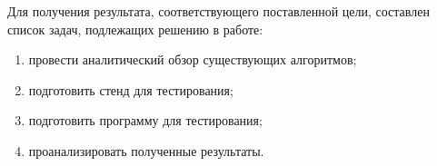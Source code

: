 Для получения результата, соответствующего поставленной цели, составлен список задач, подлежащих решению в работе:
\begin{enumerate}
    \item провести аналитический обзор существующих алгоритмов;
    \item подготовить стенд для тестирования;
    \item подготовить программу для тестирования;
    \item проанализировать полученные результаты.
\end{enumerate}

\newpage
